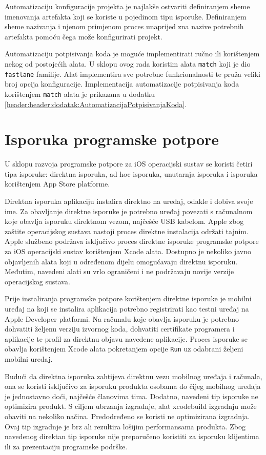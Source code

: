 \documentclass[times, utf8, diplomski, numeric]{fer}
\begin{document}
Automatizaciju konfiguracije projekta je najlakše ostvariti definiranjem sheme imenovanja artefakta koji se koriste u pojedinom tipu isporuke. Definiranjem sheme nazivanja i njenom primjenom proces unaprijed zna nazive potrebnih artefakta pomoću čega može konfigurirati projekt.

Automatizaciju potpisivanja koda je moguće implementirati ručno ili korištenjem nekog od postojećih alata. U sklopu ovog rada koristim alata \verb|match| koji je dio \verb|fastlane| familije. Alat implementira sve potrebne funkcionalnosti te pruža veliki broj opcija konfiguracije. Implementacija automatizacije potpisivanja koda korištenjem \verb|match| alata je prikazana u dodatku \ref{header:header:dodatak:AutomatizacijaPotpisivanjaKoda}.

\section{Isporuka programske potpore} \label{header:RucnaIsporuka}

U sklopu razvoja programske potpore za iOS operacijski sustav se koristi četiri tipa isporuke: direktna isporuka, ad hoc isporuka, unutarnja isporuka i isporuka korištenjem App Store platforme.

Direktna isporuka aplikaciju instalira direktno na uređaj, odakle i dobiva svoje ime. Za obavljanje direktne isporuke je potrebno uređaj povezati s računalnom koje obavlja isporuku direktnom vezom, najčešće USB kabelom. Apple zbog zaštite operacijskog sustava nastoji proces direktne instalacija održati tajnim. Apple službeno podržava isključivo proces direktne isporuke programske potpore za iOS operacijski sustav korištenjem Xcode alata. Dostupno je nekoliko javno objavljenih alata koji u određenom dijelu omogućavaju direktnu isporuku. Međutim, navedeni alati su vrlo ograničeni i ne podržavaju novije verzije operacijskog sustava.

Prije instaliranja programske potpore korištenjem direktne isporuke je mobilni uređaj na koji se instalira aplikacija potrebno registrirati kao testni uređaj na Apple Developer platformi. Na računalu koje obavlja isporuku je potrebno dohvatiti željenu verziju izvornog koda, dohvatiti certifikate programera i aplikacije te profil za direktnu objavu navedene aplikacije. Proces isporuke se obavlja korištenjem Xcode alata pokretanjem opcije \verb|Run| uz odabrani željeni mobilni uređaj.

Budući da direktna isporuka zahtijeva direktnu vezu mobilnog uređaja i računala, ona se koristi isključivo za isporuku produkta osobama do čijeg mobilnog uređaja je jednostavno doći, najčešće članovima tima. Dodatno, navedeni tip isporuke ne optimizira produkt. S ciljem ubrzanja izgradnje, alat xcodebuild izgradnju može obaviti na nekoliko načina. Predodređeno se koristi ne optimizirana izgradnja. Ovaj tip izgradnje je brz ali rezultira lošijim performansama produkta. Zbog navedenog direktan tip isporuke nije preporučeno koristiti za isporuku klijentima ili za prezentaciju programske podrške.
\end{document}
